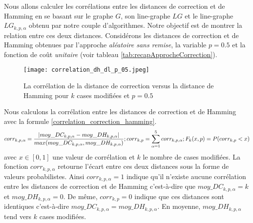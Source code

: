  \label{relationMoyDHmoyDC}
 
Nous allons calculer les corr\'elations entre les distances de correction et de Hamming en se basant sur le  graphe $G$, son line-graphe $LG$ et le line-graphe $LG_{k,p, \alpha}$ obtenu par notre couple d'algorithmes.
Notre objectif est de montrer la relation entre ces deux distances.
\newline
Consid\'erons les distances de correction et de Hamming obtenues par l'approche {\em al\'eatoire sans remise}, la variable $p = 0.5$ et la fonction de co\^ut {\em unitaire} (voir tableau \ref{tab:recapApprocheCorrection}).

 \begin{figure}[htb!] 
\centering
\texttt{[image: correlation\_dh\_dl\_p\_05.jpeg]}
\caption{ La corr\'elation de la distance de correction versus la distance de Hamming pour $k$ cases modifi\'ees et $p = 0.5$ }
\label{dh_vs_dc_p_05} 
\end{figure}
\FloatBarrier

Nous calculons la corr\'elation entre les distances de correction et de Hamming avec la formule \ref{correlation_correction_hamming}.
\begin{equation}
	corr_{k,p,\alpha} =  \frac{ | moy\_DC_{k, p,\alpha} - moy\_DH_{k,p, \alpha} | }{ max(moy\_DC_{k, p,\alpha},  moy\_DH_{k, p, \alpha}) };
	\\
	corr_{k,p} = \sum_{\alpha = 1}^{5}corr_{k,p,\alpha} ;
	\\ \newline
	F_k (x,p) = P(corr_{k,p} < x ) 
\label{correlation_correction_hamming}
\end{equation}
avec $x \in [0,1]$ une valeur de corr\'elation et $k$ le nombre de cases modifi\'ees. 
La fonction $corr_{k,p,\alpha}$ retourne l'\'ecart entre ces deux distances sous la forme de valeurs probabilistes. 
Ainsi $corr_{k,p,\alpha} = 1$ indique qu'il n'existe aucune corr\'elation entre les distances de correction et de Hamming c'est-\`a-dire que $moy\_DC_{k,p,\alpha} = k$ et $moy\_DH_{k,p,\alpha} = 0$.
De m\^eme, $corr_{k,p} = 0$ indique que ces distances sont identiques c'est-\`a-dire $ moy\_DC_{k, p, \alpha} = moy\_DH_{k,p, \alpha}$. En moyenne, $moy\_DH_{k,p, \alpha}$ tend vers $k$ cases modifi\'ees. 
\newline

